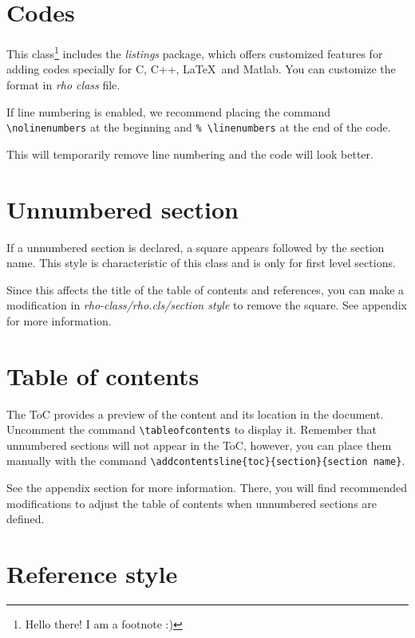 \documentclass[9pt,a4paper,twoside]{rho-class/rho}
\begin{document}
\section{Codes}

    This class\footnote{Hello there! I am a footnote :)} includes the \textit{listings} package, which offers customized features for adding codes specially for C, C++, \LaTeX\ and Matlab. You can customize the format in \textit{rho class} file.

    \nolinenumbers
    
    
    If line numbering is enabled, we recommend placing the command \verb|\nolinenumbers| at the beginning and \verb|% \linenumbers| at the end of the code. 
    
    This will temporarily remove line numbering and the code will look better.

\section*{Unnumbered section} \label{sec:unsec}

    If a unnumbered section is declared, a square appears followed by the section name. This style is characteristic of this class and is only for first level sections.

    Since this affects the title of the table of contents and references, you can make a modification in \textit{rho-class/rho.cls/section style} to remove the square. See appendix for more information.

\section{Table of contents}

    The ToC provides a preview of the content and its location in the document. Uncomment the command \verb|\tableofcontents| to display it. Remember that unnumbered sections will not appear in the ToC, however, you can place them manually with the command \verb|\addcontentsline{toc}{section}{section name}|.

    See the appendix section for more information. There, you will find recommended modifications to adjust the table of contents when unnumbered sections are defined.

\section{Reference style}
\end{document}
